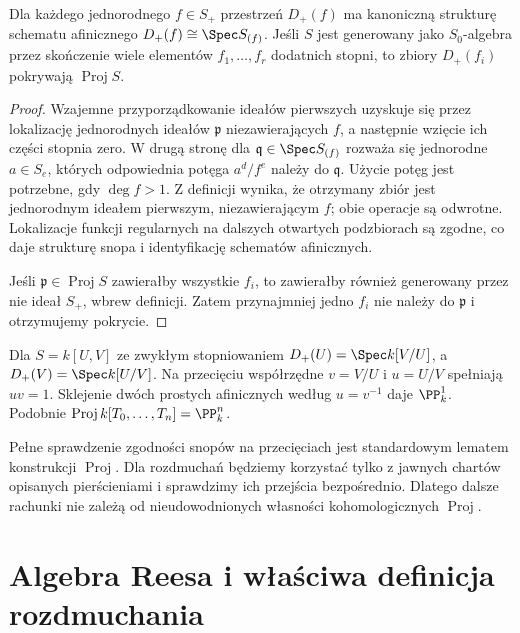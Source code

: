 \begin{stwierdzenie}
\label{st:ga5-proj-charts}
Dla każdego jednorodnego $f\in S_+$ przestrzeń $D_+(f)$
ma kanoniczną strukturę schematu afinicznego
$D_+(f)\cong\Spec S_{(f)}$. Jeśli $S$ jest generowany
jako $S_0$-algebra przez skończenie wiele elementów
$f_1,\ldots,f_r$ dodatnich stopni, to zbiory $D_+(f_i)$
pokrywają $\operatorname{Proj}S$.
\end{stwierdzenie}
\begin{proof}
Wzajemne przyporządkowanie ideałów pierwszych uzyskuje się
przez lokalizację jednorodnych ideałów $\mathfrak p$
niezawierających $f$, a następnie wzięcie ich części
stopnia zero. W drugą stronę dla
$\mathfrak q\in\Spec S_{(f)}$ rozważa się jednorodne
$a\in S_e$, których odpowiednia potęga $a^d/f^e$
należy do $\mathfrak q$. Użycie potęg jest potrzebne,
gdy $\deg f>1$. Z definicji wynika, że otrzymany zbiór
jest jednorodnym ideałem pierwszym, niezawierającym $f$;
obie operacje są odwrotne. Lokalizacje funkcji regularnych
na dalszych otwartych podzbiorach są zgodne, co daje
strukturę snopa i identyfikację schematów afinicznych.

Jeśli $\mathfrak p\in\operatorname{Proj}S$ zawierałby
wszystkie $f_i$, to zawierałby również generowany
przez nie ideał $S_+$, wbrew definicji. Zatem
przynajmniej jedno $f_i$ nie należy do $\mathfrak p$
i otrzymujemy pokrycie.
\end{proof}

\begin{przyklad}
Dla $S=k[U,V]$ ze zwykłym stopniowaniem
$D_+(U)=\Spec k[V/U]$, a $D_+(V)=\Spec k[U/V]$.
Na przecięciu współrzędne $v=V/U$ i $u=U/V$
spełniają $uv=1$. Sklejenie dwóch prostych afinicznych
według $u=v^{-1}$ daje $\PP^1_k$.
Podobnie $\operatorname{Proj}k[T_0,\ldots,T_n]=\PP^n_k$.
\end{przyklad}

\begin{uwaga}
Pełne sprawdzenie zgodności snopów na przecięciach jest
standardowym lematem konstrukcji $\operatorname{Proj}$.
Dla rozdmuchań będziemy korzystać tylko z jawnych chartów
opisanych pierścieniami i sprawdzimy ich przejścia bezpośrednio.
Dlatego dalsze rachunki nie zależą od nieudowodnionych
własności kohomologicznych $\operatorname{Proj}$.
\end{uwaga}

\section{Algebra Reesa i właściwa definicja rozdmuchania}
\label{sec:ga5-rees}

